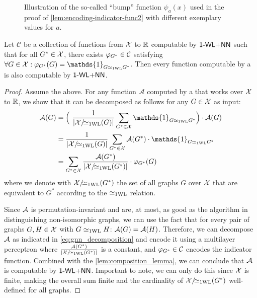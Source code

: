 \begin{figure}[!htb]
    \centering
    
    \caption{Illustration of the so-called ``bump'' function $\psi_a(x)$ used in the proof of \cref{lem:encoding-indicator-func2} with different exemplary values for $a$.}
    \label{fig:bump_function}
\end{figure}


\begin{lemma}\label{lem:decompose_gnn_as_wl}
    Let $\mathcal{C}$ be a collection of functions from $\mathcal{X}$ to $\mathbb{R}$ computable by $\textsf{1-WL+NN}$ such that for all $G^* \in \mathcal{X}$, there exists $\varphi_{G^*} \in \mathcal{C}$ satisfying $\forall G \in \cX: \varphi_{G^*}(G) = \mathds{1}_{G \wliso G^*}$. Then every function computable by a \gnn is also computable by $\textsf{1-WL+NN}$.
\end{lemma}

\begin{proof}
    Assume the above. For any function $\mathcal{A}$ computed by a \gnn that works over $\mathcal{X}$ to $\mathbb{R}$, we show that it can be decomposed as follows for any $G \in \mathcal{X}$ as input:
    \begin{align}\label{eq:gnn_decomposition}
        \mathcal{A}(G) &= \Bigl( \ \frac{1}{|\cX/\!{\wliso}(G)|}\sum_{G^* \in \cX} \mathds{1}_{G \wliso G^*} \Bigr) \cdot \mathcal{A}(G) \nonumber \\
        &= \frac{1}{|\cX/\!{\wliso}(G)|}\sum_{G^* \in \cX} \mathcal{A}(G^*) \cdot \mathds{1}_{G \wliso G^*} \nonumber \\
        &= \sum_{G^* \in \cX} \frac{\mathcal{A}(G^*)}{|\cX/\!{\wliso}(G^*)|}  \cdot \varphi_{G^*}(G)
    \end{align}
    where we denote with $\mathcal{X}/\!{\simeq_{\text{1WL}}}(G^*)$ the set of all graphs $G$ over $\mathcal{X}$ that are equivalent to $G^*$ according to the $\simeq_{\text{1WL}}$ relation.

    Since $\mathcal{A}$ is permutation-invariant and \gnns are, at most, as good as the \wl algorithm in distinguishing non-isomorphic graphs, we can use the fact that for every pair of graphs $G, H \in \mathcal{X}$ with $G \simeq_{\text{1WL}} H$: $\mathcal{A}(G) = \mathcal{A}(H)$. Therefore, we can decompose $\mathcal{A}$ as indicated in \autoref{eq:gnn_decomposition} and encode it using a multilayer perceptron where $\frac{\mathcal{A}(G^*)}{|\mathcal{X}/\!{\simeq_{\text{1WL}}}(G^*)|}$ is a constant, and $\varphi_{G^*} \in \mathcal{C}$ encodes the indicator function. Combined with the \autoref{lem:composition_lemma}, we can conclude that $\mathcal{A}$ is computable by $\textsf{1-WL+NN}$. Important to note, we can only do this since $\mathcal{X}$ is finite, making the overall sum finite and the cardinality of $\mathcal{X}/\!{\simeq_{\text{1WL}}}(G^*)$ well-defined for all graphs.
\end{proof}

